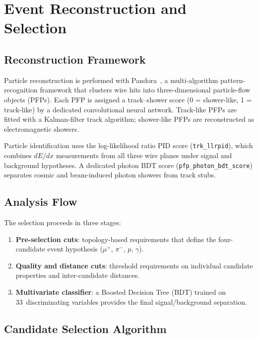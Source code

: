\documentclass[12pt,a4paper]{article}
\begin{document}
\section{Event Reconstruction and Selection}
\label{sec:selection}

\subsection{Reconstruction Framework}

Particle reconstruction is performed with Pandora~\cite{Marshall:2015rfa},
a multi-algorithm pattern-recognition framework that clusters wire
hits into three-dimensional particle-flow objects (PFPs).  Each PFP
is assigned a track--shower score (0 = shower-like, 1 = track-like)
by a dedicated convolutional neural network.  Track-like PFPs are
fitted with a Kalman-filter track algorithm; shower-like PFPs are
reconstructed as electromagnetic showers.

Particle identification uses the log-likelihood ratio PID score
(\texttt{trk\_llrpid}), which combines $dE/dx$ measurements from
all three wire planes under signal and background hypotheses.  A
dedicated photon BDT score (\texttt{pfp\_photon\_bdt\_score})
separates cosmic and beam-induced photon showers from track stubs.

\subsection{Analysis Flow}

The selection proceeds in three stages:
\begin{enumerate}
  \item \textbf{Pre-selection cuts}: topology-based requirements that
        define the four-candidate event hypothesis ($\mu^+$, $\pi^-$,
        $p$, $\gamma$).
  \item \textbf{Quality and distance cuts}: threshold requirements on
        individual candidate properties and inter-candidate distances.
  \item \textbf{Multivariate classifier}: a Boosted Decision Tree (BDT)
        trained on 33~discriminating variables provides the final
        signal/background separation.
\end{enumerate}

\subsection{Candidate Selection Algorithm}
\end{document}
